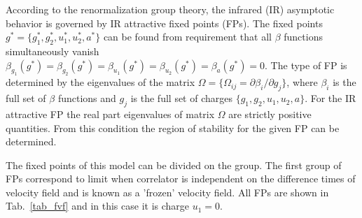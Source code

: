 According to the renormalization group theory, the infrared (IR) asymptotic behavior is governed by IR attractive fixed points (FPs). The fixed points $g^{*}=\{g_1^{*},g_2^{*},u_1^{*},u_2^{*},a^{*}\}$ can be found from requirement that all $\beta$ functions  simultaneously vanish $\beta_{g_1} (g^{*}) =\beta_{g_2} (g^{*})= \beta_{u_1} (g^{*})=\beta_{u_2} (g^{*})=\beta_{a} (g^{*})=0$. The type of FP is determined by the eigenvalues of the matrix $\Omega =\{ \Omega_{ij} = \partial \beta_i / \partial g_j \}$, where $\beta_i$ is the full set of $\beta$ functions and $g_j$ is the full set of charges $\{ g_1 ,g_2 ,u_1 ,u_2 ,a \}$. For the IR attractive FP the real part eigenvalues of matrix $\Omega$ are strictly positive quantities. From this condition the region of stability for the given FP can be determined.    

\newcommand{\fp}[2]{FP$^{\textrm{#1}}_{#2}$}

The fixed points of this model can be divided on the group. The first group of FPs correspond to limit when correlator  is independent on the difference times of velocity field and is known as a 'frozen' velocity field. All FPs are shown in Tab.~\ref{tab_fvf} and in this case it is charge $u_1=0$.

